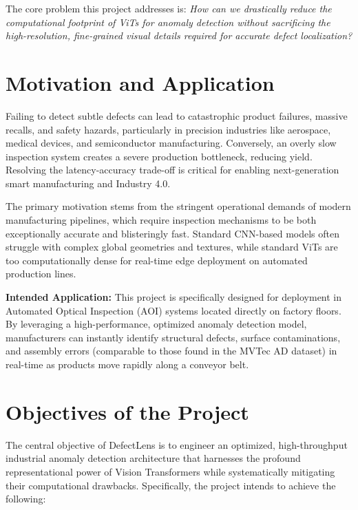 \documentclass[12pt]{article}
\begin{document}
The core problem this project addresses is: \textit{How can we drastically reduce the computational footprint of ViTs for anomaly detection without sacrificing the high-resolution, fine-grained visual details required for accurate defect localization?}

\section{Motivation and Application}
Failing to detect subtle defects can lead to catastrophic product failures, massive recalls, and safety hazards, particularly in precision industries like aerospace, medical devices, and semiconductor manufacturing. Conversely, an overly slow inspection system creates a severe production bottleneck, reducing yield. Resolving the latency-accuracy trade-off is critical for enabling next-generation smart manufacturing and Industry 4.0.

The primary motivation stems from the stringent operational demands of modern manufacturing pipelines, which require inspection mechanisms to be both exceptionally accurate and blisteringly fast. Standard CNN-based models often struggle with complex global geometries and textures, while standard ViTs are too computationally dense for real-time edge deployment on automated production lines.

\textbf{Intended Application:} This project is specifically designed for deployment in Automated Optical Inspection (AOI) systems located directly on factory floors. By leveraging a high-performance, optimized anomaly detection model, manufacturers can instantly identify structural defects, surface contaminations, and assembly errors (comparable to those found in the MVTec AD dataset) in real-time as products move rapidly along a conveyor belt.

\section{Objectives of the Project}
The central objective of DefectLens is to engineer an optimized, high-throughput industrial anomaly detection architecture that harnesses the profound representational power of Vision Transformers while systematically mitigating their computational drawbacks. Specifically, the project intends to achieve the following:
\end{document}
